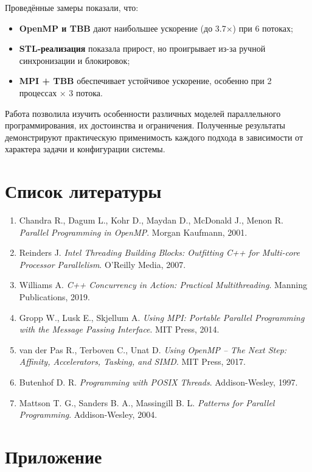 \documentclass[12pt,a4paper]{extarticle}
\begin{document}
Проведённые замеры показали, что:
\begin{itemize}
  \item \textbf{OpenMP и TBB} дают наибольшее ускорение (до 3.7×) при 6 потоках;
  \item \textbf{STL-реализация} показала прирост, но проигрывает из-за ручной
        синхронизации и блокировок;
  \item \textbf{MPI + TBB} обеспечивает устойчивое ускорение, особенно при 2
        процессах × 3 потока.
\end{itemize}

Работа позволила изучить особенности различных моделей параллельного программирования,
их достоинства и ограничения. Полученные результаты демонстрируют практическую
применимость каждого подхода в зависимости от характера задачи и конфигурации системы.

\section*{Список литературы}

\begin{enumerate}
  \item Chandra R., Dagum L., Kohr D., Maydan D., McDonald J., Menon R.
        \textit{Parallel Programming in OpenMP}. Morgan Kaufmann, 2001.
  \item Reinders J. \textit{Intel Threading Building Blocks: Outfitting C++
        for Multi-core Processor Parallelism}. O'Reilly Media, 2007.
  \item Williams A. \textit{C++ Concurrency in Action: Practical Multithreading}.
        Manning Publications, 2019.
  \item Gropp W., Lusk E., Skjellum A. \textit{Using MPI: Portable Parallel Programming
        with the Message Passing Interface}. MIT Press, 2014.
  \item van der Pas R., Terboven C., Unat D. \textit{Using OpenMP – The Next Step:
        Affinity, Accelerators, Tasking, and SIMD}. MIT Press, 2017.
  \item Butenhof D. R. \textit{Programming with POSIX Threads}. Addison-Wesley, 1997.
  \item Mattson T. G., Sanders B. A., Massingill B. L. \textit{Patterns for Parallel
        Programming}. Addison-Wesley, 2004.
\end{enumerate}


\section{Приложение}
\end{document}
